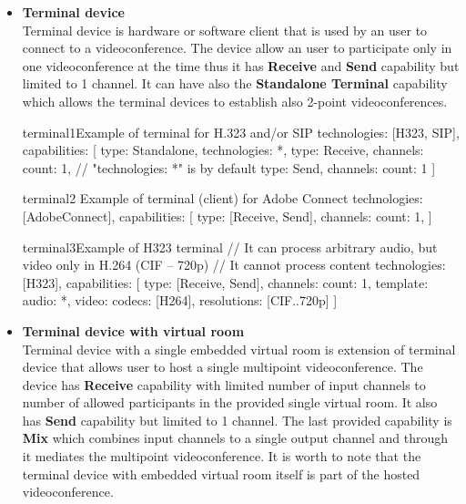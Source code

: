 \begin{itemize}

\item \textbf{Terminal device} \\
  Terminal device is hardware or software client that is used by an user to 
  connect to a videoconference. The device allow an user to participate only 
  in one videoconference at the time thus it has \textbf{Receive} and 
  \textbf{Send} capability but limited to 1 channel. It can have also the 
  \textbf{Standalone Terminal} capability which allows the terminal devices to  
  establish also 2-point videoconferences. 
  
\begin{TopologyExample}{terminal1}{Example of terminal for H.323 and/or SIP}
technologies: [H323, SIP],
capabilities: [
  {type: Standalone, technologies: *},
  {type: Receive, channels: {count: 1}}, // "technologies: *" is by default
  {type: Send, channels: {count: 1}}
]
\end{TopologyExample}

\begin{TopologyExample}{terminal2}%
      {Example of terminal (client) for Adobe Connect}
technologies: [AdobeConnect],
capabilities: [
  {type: [Receive, Send], channels: {count: 1}},
]
\end{TopologyExample}

\begin{TopologyExample}{terminal3}{Example of H323 terminal}
// It can process arbitrary audio, but video only in H.264 (CIF -- 720p)
// It cannot process content
technologies: [H323],
capabilities: [
  {type: [Receive, Send], channels: {
    count: 1, 
    template: {
      audio: *,
      video: {codecs: [H264], resolutions: [CIF..720p]}
    }  
  }}
]
\end{TopologyExample}

\item \textbf{Terminal device with virtual room} \\
  Terminal device with a single embedded virtual room is extension of terminal 
  device that allows user to host a single multipoint videoconference. The 
  device has \textbf{Receive} capability with limited number of input channels 
  to number of allowed participants in the provided single virtual room. It 
  also has \textbf{Send} capability but limited to 1 channel. The last 
  provided capability is \textbf{Mix} which combines input channels to a 
  single output channel and through it mediates the multipoint 
  videoconference. It is worth to note that the terminal device with embedded 
  virtual room itself is part of 
  the hosted videoconference.
  

\end{itemize}
